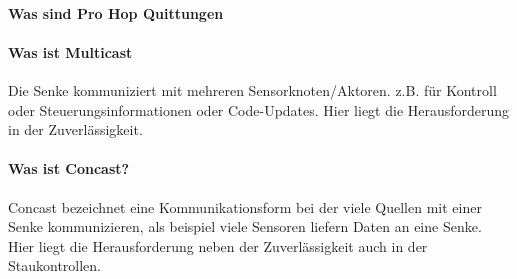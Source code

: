 	\paragraph{Was sind Pro Hop Quittungen}
	 
	
	
	
	\paragraph{Was ist Multicast}
	Die Senke kommuniziert mit mehreren Sensorknoten/Aktoren. z.B. für Kontroll oder Steuerungsinformationen oder Code-Updates. Hier liegt die Herausforderung in der Zuverlässigkeit.
	
	\paragraph{Was ist Concast?}
	Concast bezeichnet eine Kommunikationsform bei der viele Quellen mit einer Senke kommunizieren, als beispiel viele Sensoren liefern Daten an eine Senke. Hier liegt die Herausforderung neben der Zuverlässigkeit auch in der Staukontrollen.
	
	
	
	
			
	
	
	
	